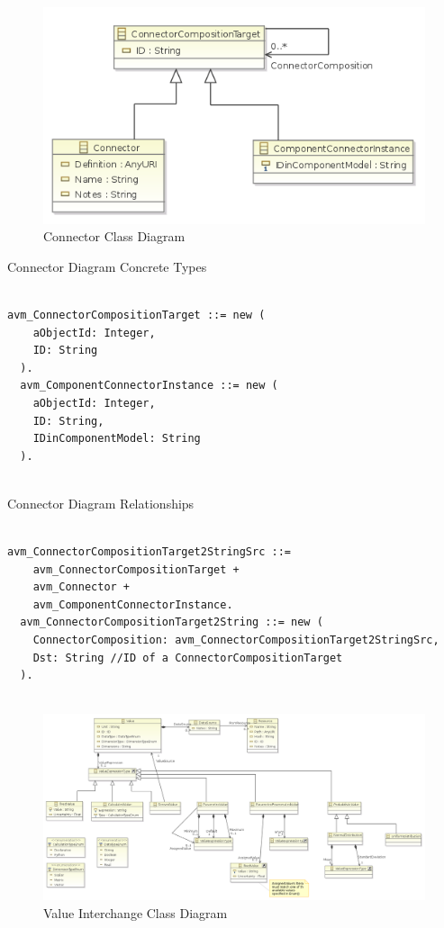 \begin{figure}[H]
\centering
\includegraphics[width=\textwidth]{./AVM_Formal_Semantics/2}
\caption{Connector Class Diagram}
\end{figure}

Connector Diagram Concrete Types
\begin{lstlisting}

avm_ConnectorCompositionTarget ::= new (
    aObjectId: Integer,
    ID: String
  ).
  avm_ComponentConnectorInstance ::= new (
    aObjectId: Integer,
    ID: String,
    IDinComponentModel: String
  ).


\end{lstlisting}

Connector Diagram Relationships
\begin{lstlisting}

avm_ConnectorCompositionTarget2StringSrc ::=
    avm_ConnectorCompositionTarget +
    avm_Connector +
    avm_ComponentConnectorInstance.
  avm_ConnectorCompositionTarget2String ::= new (
    ConnectorComposition: avm_ConnectorCompositionTarget2StringSrc,
    Dst: String //ID of a ConnectorCompositionTarget
  ).


\end{lstlisting}


\begin{figure}[H]
\centering
\includegraphics[width=\textwidth]{./AVM_Formal_Semantics/3}
\caption{Value Interchange Class Diagram}
\end{figure}

